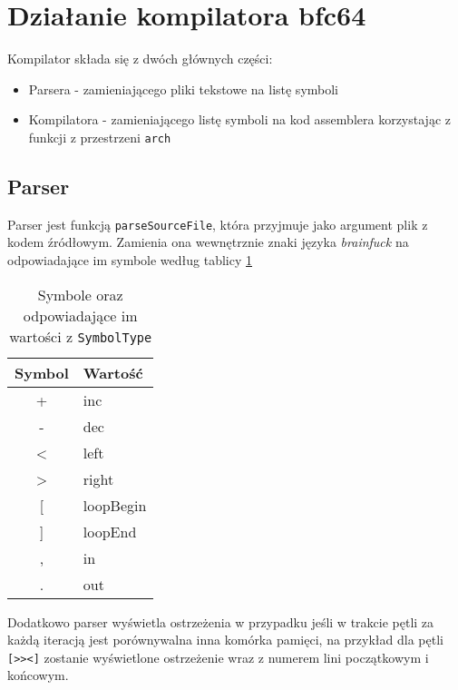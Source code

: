 \documentclass[a4paper,12pt]{article}
\begin{document}
    \section{Działanie kompilatora bfc64}

    Kompilator składa się z dwóch głównych części:
    \begin{itemize}
        \item Parsera - zamieniającego pliki tekstowe na listę symboli
        \item Kompilatora - zamieniającego listę symboli na kod assemblera korzystając z funkcji z przestrzeni \texttt{arch}
    \end{itemize}

    \subsection*{Parser}

    Parser jest funkcją \texttt{parseSourceFile}, która przyjmuje jako argument plik z kodem źródłowym. Zamienia ona wewnętrznie znaki języka \emph{brainfuck} na odpowiadające im symbole według tablicy \ref{tab:symbole}

    \begin{table}[h]
        \label{tab:symbole}
        \begin{tabular}{|c|l|}
            \hline
            Symbol         & Wartość   \\ \hline
            +              & inc       \\ \hline
            -              & dec       \\ \hline
            \textless{}    & left      \\ \hline
            \textgreater{} & right     \\ \hline
            {[}            & loopBegin \\ \hline
            {]}            & loopEnd   \\ \hline
            ,              & in        \\ \hline
            .              & out       \\ \hline
        \end{tabular}
        \centering
        \caption{Symbole oraz odpowiadające im wartości z \texttt{SymbolType}}
    \end{table}

    Dodatkowo parser wyświetla ostrzeżenia w przypadku jeśli w trakcie pętli za każdą iteracją jest porównywalna inna komórka pamięci, na przykład dla pętli \texttt{[>><]} zostanie wyświetlone ostrzeżenie wraz z numerem lini początkowym i końcowym.
\end{document}
